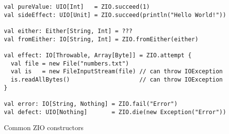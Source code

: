 \begin{algorithm}

\begin{verbatim}
val pureValue: UIO[Int]   = ZIO.succeed(1)
val sideEffect: UIO[Unit] = ZIO.succeed(println("Hello World!"))

val either: Either[String, Int] = ???
val fromEither: IO[String, Int] = ZIO.fromEither(either)

val effect: IO[Throwable, Array[Byte]] = ZIO.attempt {
  val file = new File("numbers.txt")
  val is   = new FileInputStream(file) // can throw IOException
  is.readAllBytes()                    // can throw IOException
}

val error: IO[String, Nothing] = ZIO.fail("Error")
val defect: UIO[Nothing]       = ZIO.die(new Exception("Error"))
\end{verbatim}

\caption{Common ZIO constructors \label{zio:constructors}}
\end{algorithm}